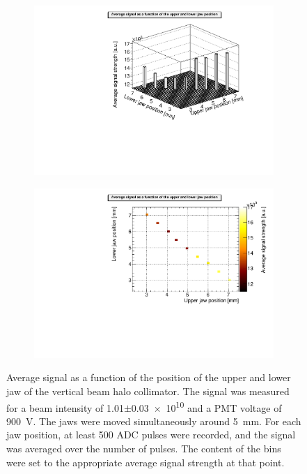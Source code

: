 \begin{figure}
\begin{subfigure}[b]{0.5\textwidth}
\includegraphics[width=\textwidth]{Figures/AsymmetricScan_5mm_beamintensity101_lego.pdf}
\end{subfigure}
\begin{subfigure}[b]{0.5\textwidth}
\includegraphics[width=\textwidth]{Figures/AsymmetricScan_5mm_beamintensity101_colz.pdf}
\end{subfigure}
\caption[RHUL Cherenkov detector signal for certain upper/lower jaw positions around \SI{5}{\milli\metre}, for a beam intensity of \num{1.01}$\pm$\num{0.03e10}]{Average signal as a function of the position of the upper and lower jaw of the vertical beam halo collimator. The signal was measured for a beam intensity of \num{1.01}$\pm$\num{0.03e10} and a PMT voltage of \SI{900}{\volt}. The jaws were moved simultaneously around \SI{5}{\milli\metre}. For each jaw position, at least 500 ADC pulses were recorded, and the signal was averaged over the number of pulses. The content of the bins were set to the appropriate average signal strength at that point.}
\label{fig:AverageSignal_Asymmetric_5mm_101}
\end{figure}
